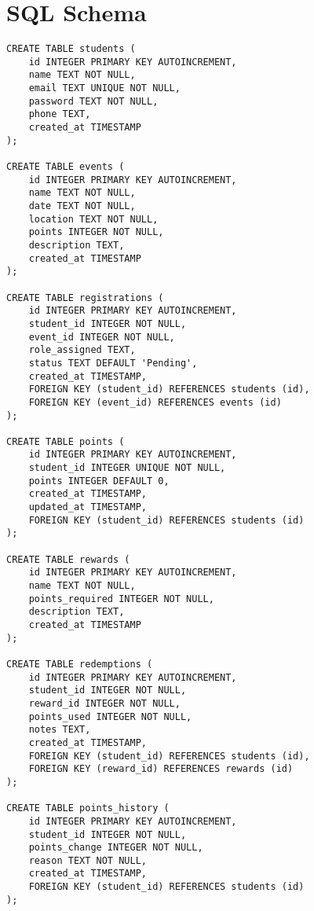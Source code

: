 \documentclass[12pt,a4paper]{report}
\begin{document}
\appendix

\chapter{SQL Schema}
\begin{lstlisting}[caption={Complete Database Schema}, label={lst:full-schema}]
CREATE TABLE students (
    id INTEGER PRIMARY KEY AUTOINCREMENT,
    name TEXT NOT NULL,
    email TEXT UNIQUE NOT NULL,
    password TEXT NOT NULL,
    phone TEXT,
    created_at TIMESTAMP
);

CREATE TABLE events (
    id INTEGER PRIMARY KEY AUTOINCREMENT,
    name TEXT NOT NULL,
    date TEXT NOT NULL,
    location TEXT NOT NULL,
    points INTEGER NOT NULL,
    description TEXT,
    created_at TIMESTAMP
);

CREATE TABLE registrations (
    id INTEGER PRIMARY KEY AUTOINCREMENT,
    student_id INTEGER NOT NULL,
    event_id INTEGER NOT NULL,
    role_assigned TEXT,
    status TEXT DEFAULT 'Pending',
    created_at TIMESTAMP,
    FOREIGN KEY (student_id) REFERENCES students (id),
    FOREIGN KEY (event_id) REFERENCES events (id)
);

CREATE TABLE points (
    id INTEGER PRIMARY KEY AUTOINCREMENT,
    student_id INTEGER UNIQUE NOT NULL,
    points INTEGER DEFAULT 0,
    created_at TIMESTAMP,
    updated_at TIMESTAMP,
    FOREIGN KEY (student_id) REFERENCES students (id)
);

CREATE TABLE rewards (
    id INTEGER PRIMARY KEY AUTOINCREMENT,
    name TEXT NOT NULL,
    points_required INTEGER NOT NULL,
    description TEXT,
    created_at TIMESTAMP
);

CREATE TABLE redemptions (
    id INTEGER PRIMARY KEY AUTOINCREMENT,
    student_id INTEGER NOT NULL,
    reward_id INTEGER NOT NULL,
    points_used INTEGER NOT NULL,
    notes TEXT,
    created_at TIMESTAMP,
    FOREIGN KEY (student_id) REFERENCES students (id),
    FOREIGN KEY (reward_id) REFERENCES rewards (id)
);

CREATE TABLE points_history (
    id INTEGER PRIMARY KEY AUTOINCREMENT,
    student_id INTEGER NOT NULL,
    points_change INTEGER NOT NULL,
    reason TEXT NOT NULL,
    created_at TIMESTAMP,
    FOREIGN KEY (student_id) REFERENCES students (id)
);
\end{lstlisting}
\end{document}
